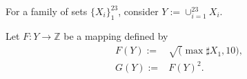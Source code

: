 \documentclass[varwidth=9cm]{standalone}
\begin{document}
For a family of sets $\{X_i\}_1^23$, consider $Y := \cup_{i=1}^23 X_i$.

Let $F: Y \to \mathbb{Z}$ be a mapping defined by
\begin{align}
    F(Y) := & \sqrt( \max{ \sharp X_1, 10 } ),\\
    G(Y) := & F(Y)^2.\\
\end{align}
\end{document}
